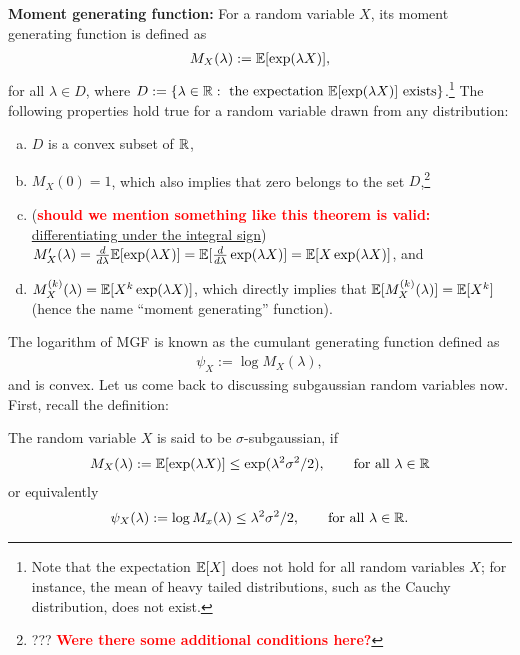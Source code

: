 \documentclass[twoside]{article}
\begin{document}
    \noindent \textbf{Moment generating function:} For a random variable $X$, its moment generating function is defined as
    \begin{align*}
      M_X(\lambda) := \mathbb{E}[\exp(\lambda X)],
    \end{align*}
    for all $\lambda \in D$, where $D := \{ \lambda \in \mathbb{R}: \text{ the expectation } \mathbb{E}[\exp(\lambda X)] \text{ exists}\}$.\footnote{Note that the expectation $\mathbb{E}[X]$ does not hold for all random variables $X$; for instance, the mean of heavy tailed distributions, such as the Cauchy distribution, does not exist.} The following properties hold true for a random variable drawn from any distribution:
    \begin{enumerate}[(a)]
    \item $D$ is a convex subset of $\mathbb{R}$,
    \item $M_X(0) = 1$, which also implies that zero belongs to the set $D$,\footnote{??? \textbf{\textcolor{red}{Were there some additional conditions here?}}}
    \item (\textbf{\textcolor{red}{should we mention something like this theorem is valid:}} \href{https://en.wikipedia.org/wiki/Leibniz_integral_rule#Measure_theory_statement}{differentiating under the integral sign}) $M_X'(\lambda) = \frac{d}{d \lambda} \mathbb{E}[\exp(\lambda X)] = \mathbb{E}[\frac{d}{d \lambda} \exp(\lambda X)] = \mathbb{E}[X \exp(\lambda X)]$, and
    \item $M_X^{(k)}(\lambda) = \mathbb{E}[X^k \exp(\lambda X)]$, which directly implies that $\mathbb{E}[M_X^{(k)}(\lambda)] = \mathbb{E}[X^k]$ (hence the name ``moment generating'' function).
    \end{enumerate}
    The logarithm of MGF is known as the cumulant generating function defined as
    \begin{align*}
      \psi_X := \log M_X(\lambda),
    \end{align*}
    and is convex. Let us come back to discussing subgaussian random variables now. First, recall the definition:
    \begin{definition}
      The random variable $X$ is said to be $\sigma$-subgaussian, if
      \begin{align*}
        M_X(\lambda) := \mathbb{E}[\exp(\lambda X)] \leq \exp(\lambda^2 \sigma^2 / 2), \qquad \text{for all } \lambda \in \mathbb{R}
      \end{align*}
      or equivalently
      \begin{align*}
        \psi_X(\lambda) := \log M_x(\lambda) \leq \lambda^2 \sigma^2 / 2, \qquad \text{for all } \lambda \in \mathbb{R}.
      \end{align*}
    \end{definition}
\end{document}
